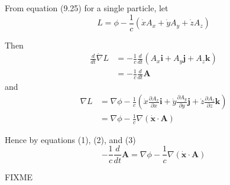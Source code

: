 From equation (9.25) for a single particle, let
\begin{equation*}
L=\phi-\frac{1}{c}(\dot xA_x+\dot yA_y+\dot zA_z)
\end{equation*}

Then
\begin{align*}
\frac{d}{dt}\dot\nabla L
&=-\frac{1}{c}\frac{d}{dt}(A_x\mathbf i+A_y\mathbf j+A_z\mathbf k)
\\[1ex]
&=-\frac{1}{c}\frac{d}{dt}\mathbf A
\tag{2}
\end{align*}
and
\begin{align*}
\nabla L
&=\nabla\phi-\frac{1}{c}
\left(
\dot x\frac{\partial A_x}{\partial x}\mathbf i
+\dot y\frac{\partial A_y}{\partial y}\mathbf j
+\dot z\frac{\partial A_z}{\partial z}\mathbf k
\right)
\\
&=\nabla\phi-\frac{1}{c}\nabla(\dot{\mathbf x}\cdot\mathbf A)
\tag{3}
\end{align*}

Hence by equations (1), (2), and (3)
\begin{equation*}
-\frac{1}{c}\frac{d}{dt}\mathbf A=\nabla\phi
-\frac{1}{c}\nabla(\dot{\mathbf x}\cdot\mathbf A)
\end{equation*}

FIXME


